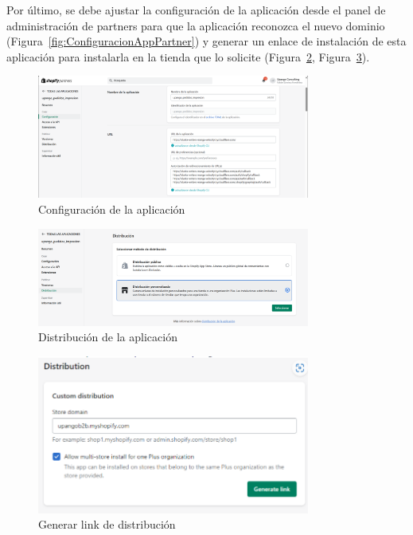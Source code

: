 \documentclass[12pt]{article}
\begin{document}
Por último, se debe ajustar la configuración de la aplicación desde el panel de administración de partners para que la aplicación reconozca el nuevo dominio (Figura~\ref{fig:ConfiguracionAppPartner}) y generar un enlace de instalación de esta aplicación
para instalarla en la tienda que lo solicite (Figura~\ref{fig:DistributionAppPartners}, Figura~\ref{fig:generarLinkDistribution}).

\begin{figure}[ht]
    \centering
    \includegraphics[width=0.8\textwidth]{imagenes/panelPartnersDistribution.png}
    \caption{\label{fig:ConfiguracionAppPartners}Configuración de la aplicación}
    \vspace{\fill}
\end{figure}

\begin{figure}[ht]
    \centering
    \includegraphics[width=0.8\textwidth]{imagenes/distribucionAppEnlace.png}
    \caption{\label{fig:DistributionAppPartners}Distribución de la aplicación}
    \vspace{\fill}
\end{figure}

\begin{figure}[ht]
    \centering
    \includegraphics[width=0.8\textwidth]{imagenes/generarLinkDistribution.png}
    \caption{\label{fig:generarLinkDistribution}Generar link de distribución}
    \vspace{\fill}
\end{figure}
\end{document}
